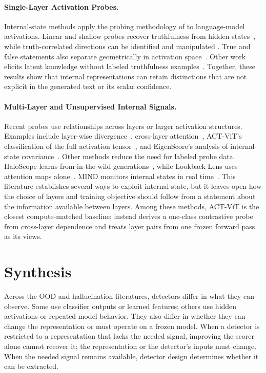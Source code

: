 \paragraph{Single-Layer Activation Probes.}
Internal-state methods apply the probing methodology of
 to language-model activations. Linear and shallow
probes recover truthfulness from hidden states~\citep{azaria2023internal}, while
truth-correlated directions can be identified and manipulated
\citep{li2023iti}. True and false statements also separate geometrically in
activation space~\citep{marks2024geometry}. Other work elicits latent knowledge
without labeled truthfulness examples~\citep{burns2023discovering}. Together,
these results show that internal representations can retain distinctions that are
not explicit in the generated text or its scalar confidence.

\paragraph{Multi-Layer and Unsupervised Internal Signals.}
Recent probes use relationships across layers or larger activation structures.
Examples include layer-wise divergence~\citep{zhang2025icr}, cross-layer
attention~\citep{suresh2025clap}, ACT-ViT's classification of the full activation
tensor~\citep{barshalom2025actvit}, and EigenScore's analysis of internal-state
covariance~\citep{chen2024inside}. Other methods reduce the need for labeled probe
data. HaloScope learns from in-the-wild generations~\citep{du2024haloscope}, while
Lookback Lens uses attention maps alone~\citep{chuang2024lookback}. MIND monitors
internal states in real time~\citep{su2024mind}. This literature establishes
several ways to exploit internal state, but it leaves open how the choice of layers
and training objective should follow from a statement about the information
available between layers. Among these methods, ACT-ViT is the closest compute-matched
baseline;  instead derives a one-class contrastive
probe from cross-layer dependence and treats layer pairs from one frozen forward
pass as its views.

\section{Synthesis}

Across the OOD and hallucination literatures, detectors differ in what they can
observe. Some use classifier outputs or learned features; others use hidden
activations or repeated model behavior. They also differ in whether they can change
the representation or must operate on a frozen model. When a detector is restricted
to a representation that lacks the needed signal, improving the scorer alone cannot
recover it; the representation or the detector's inputs must change. When the needed
signal remains available, detector design determines whether it can be extracted.

